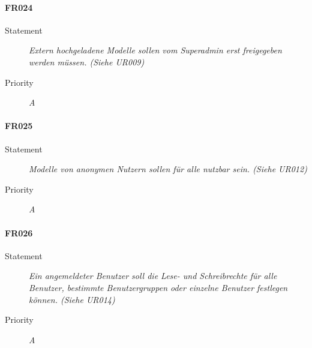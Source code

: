 \paragraph{FR024}
\begin{description}
  \item [Statement] 
    \textit{Extern hochgeladene Modelle sollen vom \gls{Superadmin} erst freigegeben werden müssen.
	(Siehe UR009)}
  \item [Priority] \textit{A}
\end{description}

\paragraph{FR025}
\begin{description}
  \item [Statement] 
    \textit{Modelle von anonymen Nutzern sollen für alle nutzbar sein.
	(Siehe UR012)}
  \item [Priority] \textit{A}
\end{description}

\paragraph{FR026}
\begin{description}
  \item [Statement] 
    \textit{Ein angemeldeter Benutzer soll die Lese- und Schreibrechte für alle Benutzer, bestimmte Benutzergruppen oder einzelne Benutzer festlegen können.
	(Siehe UR014)}
  \item [Priority] \textit{A}
\end{description}


